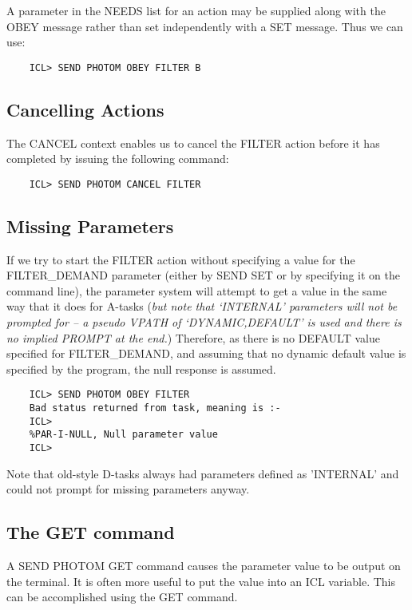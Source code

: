 \documentclass[twoside,11pt]{report}
\newcommand{\xlabel}[1]{}
\begin{document}
A parameter in the NEEDS list for an action may be supplied along with the
OBEY message rather than set independently with a SET message. Thus we
can use:

\begin{verbatim}
    ICL> SEND PHOTOM OBEY FILTER B
\end{verbatim}

\subsection{\xlabel{cancelling_actions}Cancelling Actions}

The CANCEL context enables us to cancel the FILTER action before it has
completed by issuing the following command:

\begin{verbatim}
    ICL> SEND PHOTOM CANCEL FILTER
\end{verbatim}

\subsection{\xlabel{missing_parameters}Missing Parameters}

If we try to start the FILTER action without specifying a value for the
FILTER\_DEMAND parameter (either by SEND SET or by specifying it on the
command line), the parameter system will attempt to get a value in the
same way that it does for A-tasks ({\em but note that `INTERNAL' parameters
will not be prompted for -- a pseudo VPATH of `DYNAMIC,DEFAULT' is used and
there is no implied PROMPT at the end.})
Therefore, as there is no DEFAULT value specified for FILTER\_DEMAND, and
assuming that no dynamic default value is specified by the program, the
null response is assumed.

\begin{verbatim}
    ICL> SEND PHOTOM OBEY FILTER
    Bad status returned from task, meaning is :-
    ICL>
    %PAR-I-NULL, Null parameter value
    ICL>
\end{verbatim}

Note that old-style D-tasks always had parameters defined as 'INTERNAL'
and could not prompt for missing parameters anyway.

\subsection{\xlabel{the_get_command}The GET command}

A SEND PHOTOM GET command causes the parameter value to be output on the
terminal. It is often more useful to put the value into an ICL variable.
This can be accomplished using the GET command.
\end{document}
